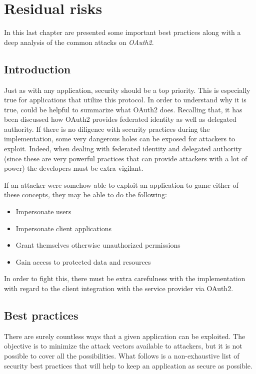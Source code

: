 \chapter{Residual risks}
In this last chapter are presented some important best practices along with a deep analysis of the common attacks on \textit{OAuth2}. 

\minitoc

\section{Introduction}
Just as with any application, security should be a top priority. This is especially true for applications that utilize this protocol. In order to understand why it is true, could be helpful to summarize what OAuth2 does. Recalling that, it has been discussed how OAuth2 provides federated identity as well as delegated authority. If there is no diligence with security practices during the implementation, some very dangerous holes can be exposed for attackers to exploit.
Indeed, when dealing with federated identity and delegated authority (since these are very powerful practices that can provide attackers with a lot of power) the developers must be extra vigilant.

If an attacker were somehow able to exploit an application to game either of these concepts, they may be able to do the following:

\begin{itemize}
    \item Impersonate users
    \item Impersonate client applications
    \item Grant themselves otherwise unauthorized permissions
    \item Gain access to protected data and resources
\end{itemize}

In order to fight this, there must be extra carefulness with the implementation with regard to the client integration with the service provider via OAuth2. 

\section{Best practices}
There are surely countless ways that a given application can be exploited. The objective is to minimize the attack vectors available to attackers, but it is not possible to cover all the possibilities. What follows is a non-exhaustive list of security best practices that will help to keep an application as secure as possible. 

